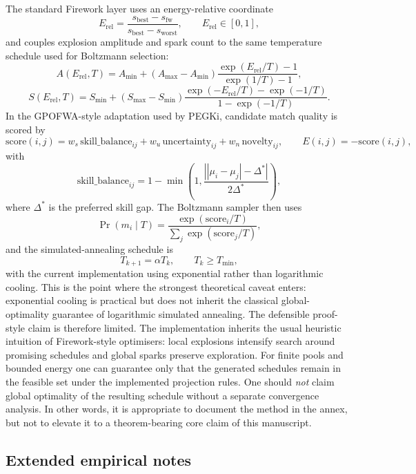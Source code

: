 \documentclass[twoside,twocolumn,9pt]{article}
\begin{document}
The standard Firework layer uses an energy-relative coordinate
\[
E_{\mathrm{rel}}=
\frac{s_{\mathrm{best}}-s_{\mathrm{fw}}}{s_{\mathrm{best}}-s_{\mathrm{worst}}},
\qquad E_{\mathrm{rel}}\in[0,1],
\]
and couples explosion amplitude and spark count to the same temperature schedule used for Boltzmann selection:
\[
A(E_{\mathrm{rel}},T)=
A_{\min}+(A_{\max}-A_{\min})
\frac{\exp(E_{\mathrm{rel}}/T)-1}{\exp(1/T)-1},
\]
\[
S(E_{\mathrm{rel}},T)=
S_{\min}+(S_{\max}-S_{\min})
\frac{\exp(-E_{\mathrm{rel}}/T)-\exp(-1/T)}{1-\exp(-1/T)}.
\]
In the GPOFWA-style adaptation used by PEGKi, candidate match quality is scored by
\[
\mathrm{score}(i,j)=
w_s\,\mathrm{skill\_balance}_{ij}
+w_u\,\mathrm{uncertainty}_{ij}
+w_n\,\mathrm{novelty}_{ij},
\qquad
E(i,j)=-\mathrm{score}(i,j),
\]
with
\[
\mathrm{skill\_balance}_{ij}
=
1-\min\!\left(
1,\frac{\left||\mu_i-\mu_j|-\Delta^\ast\right|}{2\Delta^\ast}
\right),
\]
where $\Delta^\ast$ is the preferred skill gap. The Boltzmann sampler then uses
\[
\Pr(m_i\mid T)=
\frac{\exp(\mathrm{score}_i/T)}{\sum_j \exp(\mathrm{score}_j/T)},
\]
and the simulated-annealing schedule is
\[
T_{k+1}=\alpha T_k,\qquad T_k\ge T_{\min},
\]
with the current implementation using exponential rather than logarithmic cooling. This is the point where the strongest theoretical caveat enters: exponential cooling is practical but does not inherit the classical global-optimality guarantee of logarithmic simulated annealing. The defensible proof-style claim is therefore limited. The implementation inherits the usual heuristic intuition of Firework-style optimisers: local explosions intensify search around promising schedules and global sparks preserve exploration. For finite pools and bounded energy one can guarantee only that the generated schedules remain in the feasible set under the implemented projection rules. One should \emph{not} claim global optimality of the resulting schedule without a separate convergence analysis. In other words, it is appropriate to document the method in the annex, but not to elevate it to a theorem-bearing core claim of this manuscript.

\subsection{Extended empirical notes}
\end{document}
